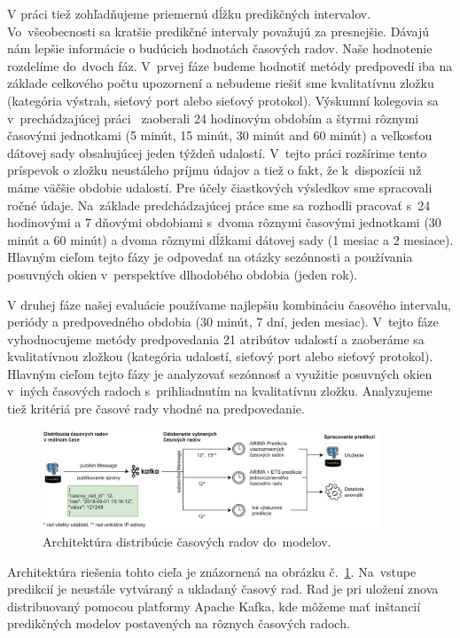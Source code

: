 \documentclass[thesismargins, thesislinespacing, openright, upjsfrontpage]{rnthesis}
\begin{document}
V práci tiež zohľadňujeme priemernú dĺžku predikčných intervalov. Vo~všeobecnosti sa kratšie predikčné intervaly považujú za presnejšie. Dávajú nám lepšie informácie o budúcich hodnotách časových radov. Naše hodnotenie rozdelíme do~dvoch fáz. V~prvej fáze budeme hodnotiť metódy predpovedí iba na základe celkového počtu upozornení a nebudeme riešiť sme kvalitatívnu zložku (kategória výstrah, sieťový port alebo sieťový protokol). Výskumní kolegovia sa v~prechádzajúcej práci~\cite{new_paper} zaoberali 24 hodinovým obdobím a štyrmi rôznymi časovými jednotkami (5 minút, 15 minút, 30 minút and 60 minút) a veľkosťou dátovej sady obsahujúcej jeden týždeň udalostí. V~tejto práci rozšírime tento príspevok o zložku neustáleho príjmu údajov a tiež o fakt, že k~dispozícii už máme väčšie obdobie udalostí. Pre účely čiastkových výsledkov sme spracovali ročné údaje. Na~základe predchádzajúcej práce sme sa rozhodli pracovať s~24 hodinovými a 7 dňovými obdobiami s~dvoma rôznymi časovými jednotkami (30 minút a 60 minút) a dvoma rôznymi dĺžkami dátovej sady (1 mesiac a 2 mesiace). Hlavným cieľom tejto fázy je odpovedať na otázky sezónnosti a používania posuvných okien v~perspektíve dlhodobého obdobia (jeden rok).

V druhej fáze našej evaluácie používame najlepšiu kombináciu časového intervalu, periódy a predpovedného obdobia (30 minút, 7 dní, jeden mesiac). V~tejto fáze vyhodnocujeme metódy predpovedania 21 atribútov udalostí a zaoberáme sa kvalitatívnou zložkou (kategória udalostí, sieťový port alebo sieťový protokol). Hlavným cieľom tejto fázy je analyzovať sezónnosť a využitie posuvných okien v~iných časových radoch s~prihliadnutím na kvalitatívnu zložku. Analyzujeme tiež kritériá pre časové rady vhodné na predpovedanie.

\begin{figure}[h]
  \centering
  \includegraphics[width=0.9\textwidth]{images/metodologia2.png}
  \caption{Architektúra distribúcie časových radov do~modelov.}
  \label{fig:c2_schema}
\end{figure}


Architektúra riešenia tohto cieľa je znázornená na obrázku č.~\ref{fig:c2_schema}. Na~vstupe predikcií je neustále vytváraný a ukladaný časový rad. Rad je pri uložení znova distribuovaný pomocou platformy Apache Kafka, kde môžeme mať inštancií predikčných modelov postavených na rôznych časových radoch.
\end{document}

